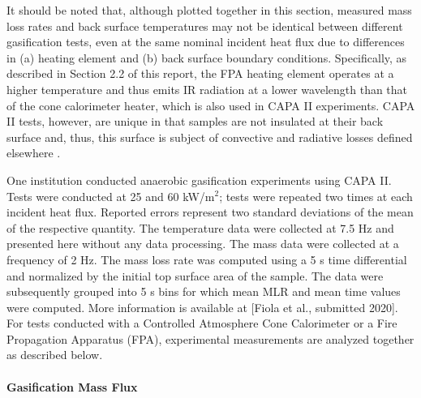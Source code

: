 \documentclass{book}
\begin{document}
It should be noted that, although plotted together in this section, measured mass loss rates and back surface temperatures may not be identical between different gasification tests, even at the same nominal incident heat flux due to differences in (a) heating element and (b) back surface boundary conditions. Specifically, as described in Section 2.2 of this report, the FPA heating element operates at a higher temperature and thus emits IR radiation at a lower wavelength than that of the cone calorimeter heater, which is also used in CAPA II experiments. CAPA II tests, however, are unique in that samples are not insulated at their back surface and, thus, this surface is subject of convective and radiative losses defined elsewhere \cite{swann2017controlled}.

One institution conducted anaerobic gasification experiments using CAPA II. Tests were conducted at 25 and 60 kW/m$^2$; tests were repeated two times at each incident heat flux. Reported errors represent two standard deviations of the mean of the respective quantity. The temperature data were collected at 7.5 Hz and presented here without any data processing. The mass data were collected at a frequency of 2 Hz. The mass loss rate was computed using a 5 s time differential and normalized by the initial top surface area of the sample. The data were subsequently grouped into 5 s bins for which mean MLR and mean time values were computed. More information is available at [Fiola et al., submitted 2020]. For tests conducted with a Controlled Atmosphere Cone Calorimeter or a Fire Propagation Apparatus (FPA), experimental measurements are analyzed together as described below.

\paragraph{Gasification Mass Flux}
\end{document}
